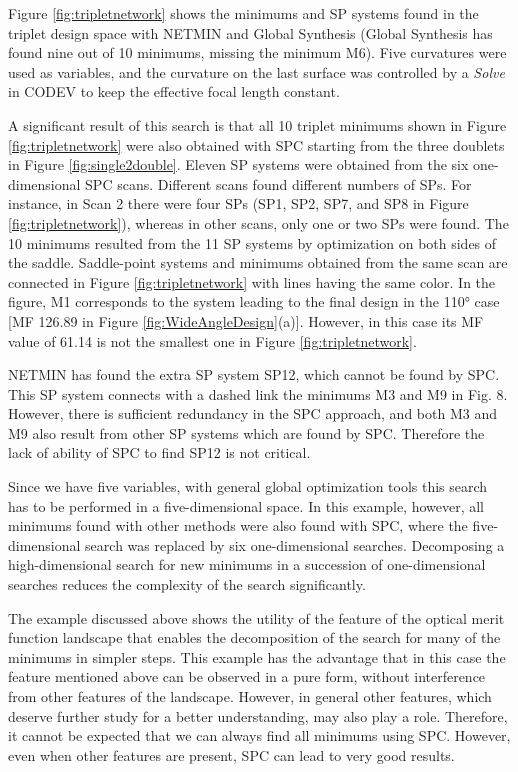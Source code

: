 Figure \ref{fig:tripletnetwork} shows the minimums and SP systems found in the triplet design space with NETMIN and Global Synthesis (Global Synthesis has found nine out of 10 minimums, missing the minimum M6). Five curvatures were used as variables, and the curvature on the last surface was controlled by a \textit{Solve} in CODEV to keep the effective focal length constant.

A significant result of this search is that all 10 triplet minimums shown in Figure \ref{fig:tripletnetwork} were also obtained with SPC starting from the three doublets in Figure \ref{fig:single2double}. Eleven SP systems were obtained from the six one-dimensional SPC scans. Different scans found different numbers of SPs. For instance, in Scan 2 there were four SPs (SP1, SP2, SP7, and SP8 in Figure \ref{fig:tripletnetwork}), whereas in other scans, only one or two SPs were found. The 10 minimums resulted from the 11 SP systems by optimization on both sides of the saddle. Saddle-point systems and minimums obtained from the same scan are connected in Figure \ref{fig:tripletnetwork} with lines having the same color. In the figure, M1 corresponds to the system leading to the final design in the 110° case [MF 126.89 in Figure \ref{fig:WideAngleDesign}(a)]. However, in this case its MF value of 61.14 is not the smallest one in Figure \ref{fig:tripletnetwork}.

NETMIN has found the extra SP system SP12, which cannot be found by SPC. This SP system connects with a dashed link the minimums M3 and M9 in Fig. 8. However, there is sufficient redundancy in the SPC approach, and both M3 and M9 also result from other SP systems which are found by SPC. Therefore the lack of ability of SPC to find SP12 is not critical.

Since we have five variables, with general global optimization tools this search has to be performed in a five-dimensional space. In this example, however, all minimums found with other methods were also found with SPC, where the five-dimensional search was replaced by six one-dimensional searches. Decomposing a high-dimensional search for new minimums in a succession of one-dimensional searches reduces the complexity of the search significantly.

The example discussed above shows the utility of the feature of the optical merit function landscape that enables the decomposition of the search for many of the minimums in simpler steps. This example has the advantage that in this case the feature mentioned above can be observed in a pure form, without interference from other features of the landscape. However, in general other features, which deserve further study for a better understanding, may also play a role. Therefore, it cannot be expected that we can always find all minimums using SPC. However, even when other features are present, SPC can lead to very good results.

